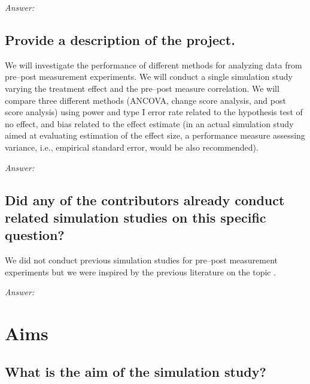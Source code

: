 \documentclass[12pt]{article}
\begin{document}
\textit{Answer:}

\subsection{Provide a description of the project.}


\begin{examplebox}
    We will investigate the performance of different methods for analyzing data from pre--post measurement experiments. We will conduct a single simulation study varying the treatment effect and the pre--post measure correlation. We will compare three different methods (ANCOVA, change score analysis, and post score analysis) using power and type I error rate related to the hypothesis test of no effect, and bias related to the effect estimate (in an actual simulation study aimed at evaluating estimation of the effect size, a performance measure assessing variance, i.e., empirical standard error, would be also recommended).
\end{examplebox}

\textit{Answer:}

\subsection{Did any of the contributors already conduct related simulation studies on this specific question?}


\begin{examplebox}
    We did not conduct previous simulation studies for pre--post measurement experiments but we were inspired by the previous literature on the topic \parencite{vickers2001use, senn2006change, van2013ancova, clifton2019correlation, ludtke2023ancova}.
\end{examplebox}

\textit{Answer:}

\section{Aims}
\subsection{What is the aim of the simulation study?}
\end{document}
